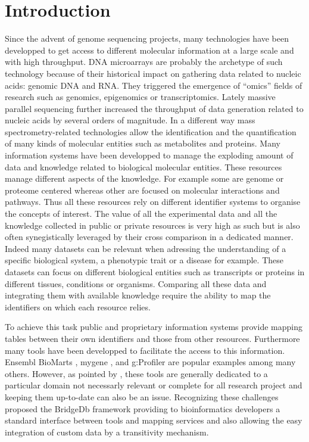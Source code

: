 \documentclass[9pt,a4paper,]{extarticle}
\theoremstyle{definition}
\theoremstyle{definition}
\theoremstyle{definition}
\theoremstyle{remark}
\begin{document}
\section{Introduction}\label{introduction}

Since the advent of genome sequencing projects, many technologies have been
developped to get access to different molecular information at a large scale
and with high throughput. DNA microarrays are probably the archetype of such
technology because of their historical impact on gathering data related
to nucleic acids: genomic DNA and RNA. They triggered the emergence of
``omics'' fields of research such as genomics, epigenomics or transcriptomics.
Lately massive parallel sequencing
further increased the throughput of data generation related to nucleic acids
by several orders of magnitude.
In a different way mass spectrometry-related technologies allow the
identification and the quantification of many kinds of molecular entities
such as metabolites and proteins.
Many information systems have been developped to manage
the exploding amount of data and knowledge related to biological
molecular entities.
These resources manage different aspects of
the knowledge.
For example some are genome or proteome centered whereas other
are focused on molecular interactions and pathways.
Thus all these resources rely on different identifier systems to organise
the concepts of interest.
The value of all the experimental data and all the knowledge
collected in public or private resources is very high as such
but is also often synegistically leveraged by their cross comparison
in a dedicated manner. Indeed many datasets can be relevant when
adressing the understanding of a specific biological system, a phenotypic trait
or a disease for example. These datasets can focus on different biological
entities such as transcripts or proteins in different tissues, conditions
or organisms. Comparing all these data and integrating them with
available knowledge require the ability to map the identifiers on which
each resource relies.

To achieve this task public and proprietary information systems
provide mapping tables between their own identifiers and those
from other resources.
Furthermore many tools have been developped to facilitate the access
to this information.
Ensembl BioMarts \citep{kinsella_ensembl_2011},
mygene \citep{wu_biogps_2013},
and g:Profiler \citep{reimand_g:profiler-web_2016}
are popular examples among many others.
However, as pointed by \citet{van_iersel_bridgedb_2010}, these tools
are generally dedicated to a particular domain not necessarly
relevant or complete for all research project and keeping them
up-to-date can also be an issue.
Recognizing these challenges \citet{van_iersel_bridgedb_2010} proposed
the BridgeDb framework providing to bioinformatics developers
a standard interface between tools and
mapping services and also allowing the easy integration of custom data
by a transitivity mechanism.
\end{document}
